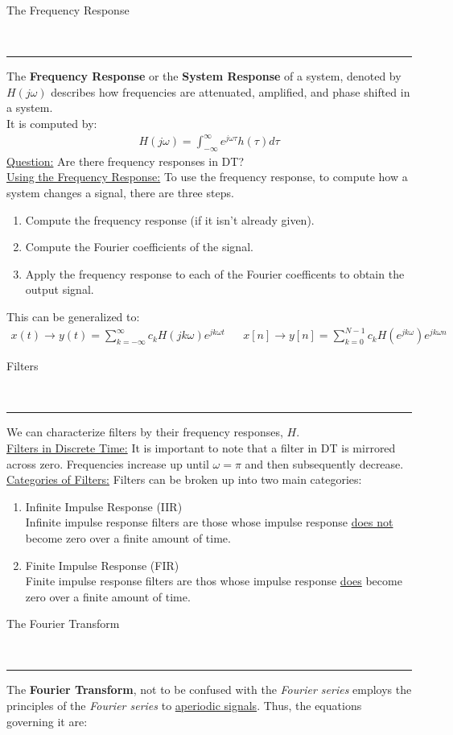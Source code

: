\documentclass{article}
\newcommand{\header}[1]{\begin{large}\noindent #1\end{large}\\\rule{\textwidth}{0.5pt}}
\newcommand{\gap}{\medskip\\}
\begin{document}
\header{The Frequency Response}

The \textbf{Frequency Response} or the \textbf{System Response} of a system, denoted
by $H(j\omega)$ describes how frequencies are attenuated, amplified, and phase shifted
in a system. 
\smallskip\\
It is computed by:
\begin{align*}
    H(j\omega) = \int_{-\infty}^\infty e^{j\omega \tau}h(\tau){d}\tau 
\end{align*}
\underline{Question:} Are there frequency responses in DT?
\gap
\underline{Using the Frequency Response:} To use the frequency response, to compute
how a system changes a signal, there are three steps.
\begin{enumerate}
    \item Compute the frequency response (if it isn't already given).
    \item Compute the Fourier coefficients of the signal.
    \item Apply the frequency response to each of the Fourier coefficents to obtain
    the output signal.
\end{enumerate}
This can be generalized to:
\begin{align*}
    x(t) \to y(t) = \sum_{k = -\infty}^\infty c_k H(jk \omega)e^{jk\omega t} &&
    x[n] \to y[n] = \sum_{k = 0}^{N - 1}c_k H(e^{jk\omega})e^{jk\omega n}
\end{align*}

\header{Filters}
We can characterize filters by their frequency responses, $H$.
\gap
\underline{Filters in Discrete Time:} It is important to note that a filter in DT
is mirrored across zero. Frequencies increase up until $\omega = \pi$ and then
subsequently decrease.
\gap
\underline{Categories of Filters:} Filters can be broken up into two main categories:
\begin{enumerate}
    \item Infinite Impulse Response (IIR)\\
    Infinite impulse response filters are those whose impulse response \underline{does not}
    become zero over a finite amount of time.
    \item Finite Impulse Response (FIR)\\
    Finite impulse response filters are thos whose impulse response \underline{does} 
    become zero over a finite amount of time.
\end{enumerate}

\pagebreak

\header{The Fourier Transform}
The \textbf{Fourier Transform}, not to be confused with the \textit{Fourier series}
employs the principles of the \textit{Fourier series} to \underline{aperiodic signals}.
Thus, the equations governing it are:
\end{document}
